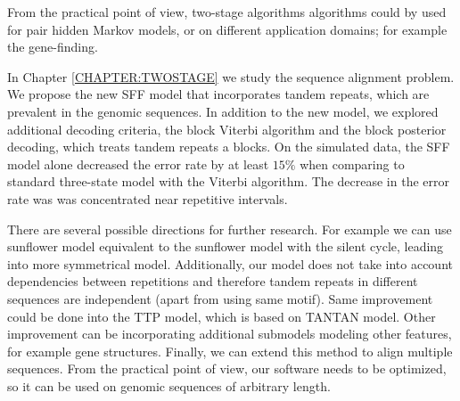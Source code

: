 From the practical point of view, two-stage algorithms algorithms could by used
for pair hidden Markov models, or on different application domains; for example
the gene-finding.

In Chapter \ref{CHAPTER:TWOSTAGE} we study the sequence alignment problem. We
propose the new SFF model that incorporates tandem repeats, which are prevalent
in the genomic sequences. In addition to the new model, we explored additional
decoding criteria, the block Viterbi algorithm and the block posterior
decoding, which treats tandem repeats a blocks. On the simulated data, the SFF
model alone decreased the error rate by at least $15\%$ when comparing to
standard three-state model with the Viterbi algorithm. The decrease in the
error rate was was concentrated near repetitive intervals. 

There are several possible directions for further research. For example we can
use sunflower model equivalent to the sunflower model with the silent cycle,
leading into more symmetrical model. Additionally, our model does not take into
account dependencies between repetitions and therefore tandem repeats in
different sequences are independent (apart from using same motif). Same
improvement could be done into the TTP model, which is based on TANTAN model.
Other improvement can be incorporating additional submodels modeling other
features, for example gene structures. Finally, we can extend this method to
align multiple sequences. From the practical point of view, our software needs
to be optimized, so it can be used on genomic sequences of arbitrary length.

\label{LastPage}
